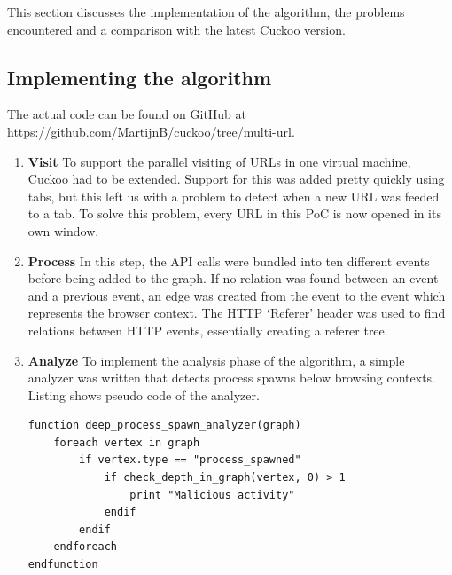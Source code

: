 This section discusses the implementation of the algorithm, the problems encountered and a comparison with the latest Cuckoo version.

\subsection{Implementing the algorithm}

The actual code can be found on GitHub at \url{https://github.com/MartijnB/cuckoo/tree/multi-url}.

\begin{enumerate}
\item \textbf{Visit} To support the parallel visiting of URLs in one virtual machine, Cuckoo had to be extended. Support for this was added pretty quickly using tabs, but this left us with a problem to detect when a new URL was feeded to a tab. To solve this problem, every URL in this PoC is now opened in its own window.


\item \textbf{Process} In this step, the API calls were bundled into ten different events before being added to the graph. If no relation was found between an event and a previous event, an edge was created from the event to the event which represents the browser context. The HTTP `Referer' header was used to find relations between HTTP events, essentially creating a referer tree.\cite{http://pdf.aminer.org/000/654/566/analysis_of_user_web_traffic_with_a_focus_on_search.pdf} 


\item \textbf{Analyze} To implement the analysis phase of the algorithm, a simple analyzer was written that detects process spawns below browsing contexts. Listing  shows pseudo code of the analyzer.

\begin{lstlisting}
function deep_process_spawn_analyzer(graph)
    foreach vertex in graph
        if vertex.type == "process_spawned"
            if check_depth_in_graph(vertex, 0) > 1
                print "Malicious activity"
            endif
        endif
    endforeach
endfunction


\end{lstlisting}
\end{enumerate}

